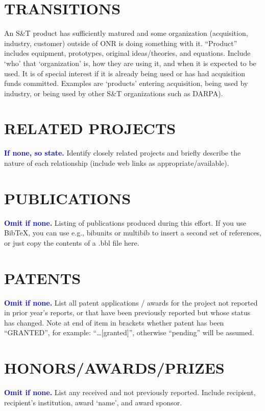 \documentclass{onrannual}
\begin{document}
\section{TRANSITIONS}
An S\&T product has sufficiently matured and some organization (acquisition, industry, customer) outside of ONR is doing
something with it. ``Product'' includes equipment, prototypes, original ideas/theories, and equations. Include `who'
that `organization' is, how they are using it, and when it is expected to be used. It is of special interest if it is
already being used or has had acquisition funds committed. Examples are `products' entering acquisition, being used by
industry, or being used by other S\&T organizations such as DARPA).

\section{RELATED PROJECTS}
\textcolor{blue}{\textbf{If none, so state.}}
Identify closely related projects and briefly describe the nature of each relationship (include web links as
appropriate/available).

\nocite{omitifnone} %


\section{PUBLICATIONS}
\textcolor{blue}{\textbf{Omit if none.}}
Listing of publications produced during this effort. If you use Bib\TeX, you can use e.g., bibunits or multibib to
insert a second set of references, or just copy the contents of a .bbl file here.

\section{PATENTS}
\textcolor{blue}{\textbf{Omit if none.}}
List all patent applications / awards for the project not reported in prior year's reports, or that have been previously
reported but whose status has changed. Note at end of item in brackets whether patent has been ``GRANTED'', for example:
``\ldots[granted]'', otherwise ``pending'' will be assumed.

\section{HONORS/AWARDS/PRIZES}
\textcolor{blue}{\textbf{Omit if none.}}
List any received and not previously reported. Include recipient, recipient's institution, award `name', and award
sponsor.
\end{document}
